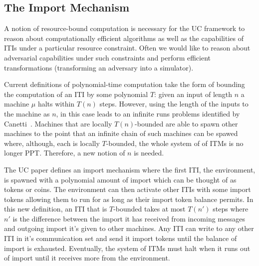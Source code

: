 \subsection{The Import Mechanism}
A notion of resource-bound computation is necessary for the UC framework to reason about computationally efficient algorithms as well as the capabilities of ITIs under a particular resource constraint.
Often we would like to reason about adversarial capabilities under such constraints and perform efficient transformations (transforming an adversary into a simulator).

Current definitions of polynomial-time computation take the form of bounding the computation of an ITI by some polynomial $T$:
given an input of length $n$ a machine $\mu$ halts within $T(n)$ steps.
However, using the length of the inputs to the machine as $n$, in this case leads to an infinite runs problems identified by Canetti~\cite{uc}.
Machines that are locally $T(n)$-bounded are able to spawn other machines to the point that an infinite chain of such machines can be spawed where, although, each is locally $T$-bounded, the whole system of of ITMs is no longer PPT. 
Therefore, a new notion of $n$ is needed. 

The UC paper defines an import mechanism where the first ITI, the environment, is spawned with a polynomial amount of import which can be thought of as tokens or coins.
The environment can then activate other ITIs with some import tokens allowing them to run for as long as their import token balance permits. 
In this new definition, an ITI that is $T$-bounded takes at most $T(n')$ steps where $n'$ is the difference between the import it has received from incoming messages and outgoing import it's given to other machines.
Any ITI can write to any other ITI in it's communication set and send it import tokens until the balance of import is exhausted.
Eventually, the system of ITMs must halt when it runs out of import until it receives more from the environment.

